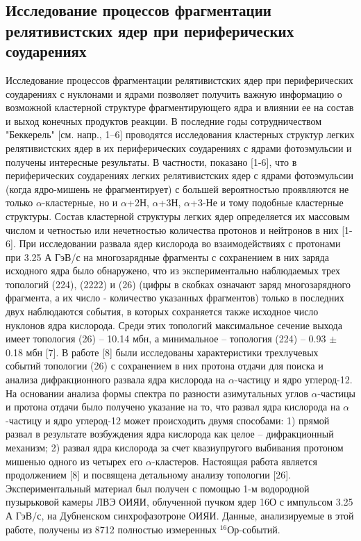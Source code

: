 \documentclass[fontsize=14pt]{scrarticle}
\begin{document}
\subsection{Исследование процессов фрагментации релятивистских ядер при периферических соударениях}
\hspace{0.6cm}
Исследование процессов фрагментации релятивистских ядер при периферических соударениях с нуклонами и ядрами позволяет получить важную информацию о возможной кластерной структуре фрагментирующего ядра и влиянии ее на состав и выход конечных продуктов реакции. В последние годы сотрудничеством "Беккерель" [см. напр., 1–6] проводятся исследования кластерных структур легких релятивистских ядер в их периферических соударениях с ядрами фотоэмульсии и получены интересные результаты. В частности, показано [1-6], что в периферических соударениях легких релятивистских ядер с ядрами фотоэмульсии (когда ядро-мишень не фрагментирует) с большей вероятностью проявляются не только $\alpha$-кластерные, но и $\alpha$+2Н, $\alpha$+3Н, $\alpha$+3-Не и тому подобные кластерные структуры. Состав кластерной структуры легких ядер определяется их массовым числом и четностью или нечетностью количества протонов и нейтронов в них [1-6]. При исследовании развала ядер кислорода во взаимодействиях с протонами при 3.25 А ГэВ/с на многозарядные фрагменты с сохранением в них заряда исходного ядра было обнаружено, что из экспериментально наблюдаемых трех топологий (224), (2222) и (26) (цифры в скобках означают заряд многозарядного фрагмента, а их число - количество указанных фрагментов) только в последних
двух наблюдаются события, в которых сохраняется также исходное число нуклонов ядра кислорода. Среди этих топологий максимальное сечение выхода имеет топология (26) – 10.14 мбн, а минимальное – топология (224) – 0.93 $\pm$ 0.18 мбн [7]. В работе [8] были исследованы характеристики трехлучевых событий топологии (26) с сохранением в них протона отдачи для поиска и анализа дифракционного развала ядра кислорода на $\alpha$-частицу и ядро углерод-12. На основании анализа формы спектра по разности азимутальных углов $\alpha$-частицы и протона отдачи было получено указание на то, что развал ядра кислорода на $\alpha$-частицу и ядро углерод-12 может происходить двумя способами: 1) прямой развал в результате возбуждения ядра кислорода как целое – дифракционный механизм; 2) развал ядра кислорода за счет квазиупругого выбивания протоном мишенью одного из четырех его $\alpha$-кластеров. Настоящая работа является продолжением [8] и посвящена детальному анализу топологии [26]. Экспериментальный материал был получен с помощью 1-м водородной пузырьковой камеры ЛВЭ ОИЯИ, облученной пучком ядер 16О с импульсом 3.25 А ГэВ/с, на Дубненском  синхрофазотроне ОИЯИ. Данные, анализируемые в этой работе, получены из 8712 полностью измеренных $^{16}$Ор-событий.
\end{document}
